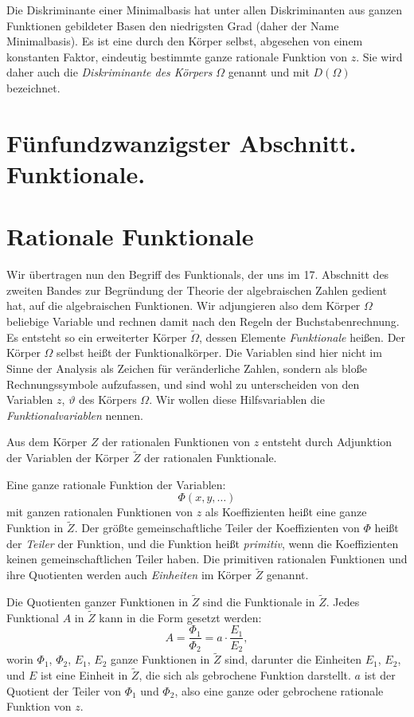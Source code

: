 \documentclass[12pt,a4paper]{article}
\theoremstyle{definition}
\begin{document}
Die Diskriminante einer Minimalbasis hat unter allen Diskriminanten aus ganzen Funktionen gebildeter Basen den niedrigsten Grad (daher der Name Minimalbasis). Es ist eine durch den Körper selbst, abgesehen von einem konstanten Faktor, eindeutig bestimmte ganze rationale Funktion von $z$. Sie wird daher auch die \emph{Diskriminante des Körpers} $\Omega$ genannt und mit $D(\Omega)$ bezeichnet.

\newpage
\section*{Fünfundzwanzigster Abschnitt. Funktionale.}

\section{Rationale Funktionale}

Wir übertragen nun den Begriff des Funktionals, der uns im 17. Abschnitt des zweiten Bandes zur Begründung der Theorie der algebraischen Zahlen gedient hat, auf die algebraischen Funktionen. Wir adjungieren also dem Körper $\Omega$ beliebige Variable und rechnen damit nach den Regeln der Buchstabenrechnung. Es entsteht so ein erweiterter Körper $\tilde{\Omega}$, dessen Elemente \emph{Funktionale} heißen. Der Körper $\Omega$ selbst heißt der Funktionalkörper. Die Variablen sind hier nicht im Sinne der Analysis als Zeichen für veränderliche Zahlen, sondern als bloße Rechnungssymbole aufzufassen, und sind wohl zu unterscheiden von den Variablen $z$, $\vartheta$ des Körpers $\Omega$. Wir wollen diese Hilfsvariablen die \emph{Funktionalvariablen} nennen.

Aus dem Körper $Z$ der rationalen Funktionen von $z$ entsteht durch Adjunktion der Variablen der Körper $\tilde{Z}$ der rationalen Funktionale.

Eine ganze rationale Funktion der Variablen:
\[\Phi(x, y, \ldots)\]
mit ganzen rationalen Funktionen von $z$ als Koeffizienten heißt eine ganze Funktion in $\tilde{Z}$. Der größte gemeinschaftliche Teiler der Koeffizienten von $\Phi$ heißt der \emph{Teiler} der Funktion, und die Funktion heißt \emph{primitiv}, wenn die Koeffizienten keinen gemeinschaftlichen Teiler haben. Die primitiven rationalen Funktionen und ihre Quotienten werden auch \emph{Einheiten} im Körper $\tilde{Z}$ genannt.

Die Quotienten ganzer Funktionen in $\tilde{Z}$ sind die Funktionale in $\tilde{Z}$. Jedes Funktional $A$ in $\tilde{Z}$ kann in die Form gesetzt werden:
\begin{equation}
A = \frac{\Phi_1}{\Phi_2} = a \cdot \frac{E_1}{E_2},
\end{equation}
worin $\Phi_1$, $\Phi_2$, $E_1$, $E_2$ ganze Funktionen in $\tilde{Z}$ sind, darunter die Einheiten $E_1$, $E_2$, und $E$ ist eine Einheit in $\tilde{Z}$, die sich als gebrochene Funktion darstellt. $a$ ist der Quotient der Teiler von $\Phi_1$ und $\Phi_2$, also eine ganze oder gebrochene rationale Funktion von $z$.
\end{document}
